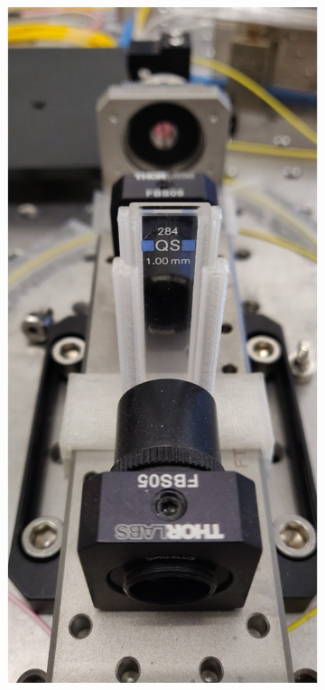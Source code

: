 \begin{figure}[t]
    \centering
    \begin{subfigure}[b]{0.3\textwidth}
        \centering
        \includegraphics[width=\textwidth]{figs/4-Raman/1mmCS2.jpg}

\end{subfigure}
\end{figure}
